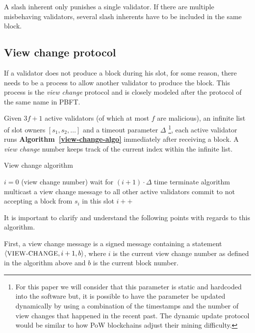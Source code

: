 \documentclass[conference]{IEEEtran}
\begin{document}
A slash inherent only punishes a single validator. If there are multiple misbehaving validators, several slash inherents have to be included in the same block.

\subsection{View change protocol} \label{view-change}
If a validator does not produce a block during his slot, for some reason, there needs to be a process to allow another validator to produce the block. This process is the \textit{view change} protocol and is closely modeled after the protocol of the same name in PBFT.

Given $3f+1$ active validators (of which at most $f$ are malicious), an infinite list of slot owners $[s_1, s_2, \ldots]$ and a timeout parameter $\Delta$ \footnote{For this paper we will consider that this parameter is static and hardcoded into the software but, it is possible to have the parameter be updated dynamically by using a combination of the timestamps and the number of view changes that happened in the recent past. The dynamic update protocol would be similar to how PoW blockchains adjust their mining difficulty.}, each active validator runs \textbf{Algorithm~\ref{view-change-algo}} immediately after receiving a block.
A \textit{view change} number keeps track of the current index within the infinite list.

\begin{algorithm}
	\caption{View change algorithm}
	\label{view-change-algo}
	\begin{algorithmic}[0]
		\State $i=0$ (view change number)
		\Loop
		\State wait for $(i+1) \cdot \Delta$ time
			\State terminate algorithm
		\Else
			\State multicast a view change message to all other active validators
		\EndIf
			\State commit to not accepting a block from $s_i$ in this slot
			\State $i++$
		\EndIf
		\EndLoop
	\end{algorithmic}
\end{algorithm}

It is important to clarify and understand the following points with regards to this algorithm.

First, a view change message is a signed message containing a statement $\langle{\small\textsc{VIEW-CHANGE}}, i+1, b\rangle$, where $i$ is the current view change number as defined in the algorithm above and $b$ is the current block number.
\end{document}
